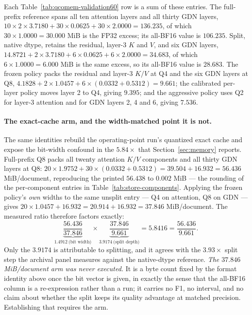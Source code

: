 \documentclass{article}
\begin{document}
Each Table~\ref{tab:qcomem-validation60} row is a sum of these entries.  The
full-prefix reference spans all ten attention layers and all thirty GDN layers,
$10\times2\times3.7180+30\times0.0625+30\times2.0000=136.235$, of which
$30\times1.0000=30.000$ MiB is the FP32 excess; its all-BF16 value is
$106.235$.  Split, native dtype, retains the residual, layer-3 $K$ and $V$, and six GDN
layers, $14.8721+2\times3.7180+6\times0.0625+6\times2.0000=34.683$, of which
$6\times1.0000=6.000$ MiB is the same excess, so its all-BF16 value is
$28.683$.  The frozen policy packs the residual and layer-3 $K/V$ at Q4 and the
six GDN layers at Q8, $4.1828+2\times1.0457+6\times(0.0332+0.5312)=9.661$; the
calibrated per-layer policy moves layer 2 to Q4, giving $9.395$; and the aggressive
policy uses Q2 for layer-3 attention and for GDN layers 2, 4 and 6, giving
$7.536$.

\paragraph{The exact-cache arm, and the width-matched point it is not.}
The same identities rebuild the operating-point run's quantized exact cache and
expose the bit-width confound in the $5.84\times$ that Section~\ref{sec:memory}
reports.  Full-prefix Q8 packs all twenty attention $K/V$ components and all
thirty GDN layers at Q8:
$20\times1.9752+30\times(0.0332+0.5312)=39.504+16.932=56.436$ MiB/document,
reproducing the printed $56.438$ to $0.002$ MiB --- the rounding of the
per-component entries in Table~\ref{tab:store-components}.  Applying the frozen
policy's \emph{own} widths to the same unsplit entry --- Q4 on attention, Q8 on
GDN --- gives $20\times1.0457+16.932=20.914+16.932=37.846$ MiB/document.  The
measured ratio therefore factors exactly:
\[
  \underbrace{\frac{56.436}{37.846}}_{1.4912\ \text{(bit width)}}\times
  \underbrace{\frac{37.846}{9.661}}_{3.9174\ \text{(split depth)}}
  =5.8416=\frac{56.436}{9.661}.
\]
Only the $3.9174$ is attributable to splitting, and it agrees with the
$3.93\times$ split step the archival panel measures against the native-dtype
reference.  \emph{The $37.846$ MiB/document arm was never executed.}  It is a
byte count fixed by the format identity above once the bit vector is given, in
exactly the sense that the all-BF16 column is a re-expression rather than a run;
it carries no F1, no interval, and no claim about whether the split keeps its
quality advantage at matched precision.  Establishing that requires the arm.
\end{document}
